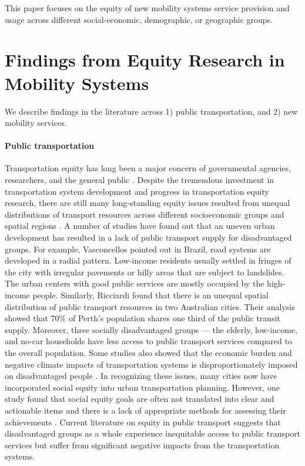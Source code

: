 \documentclass[11pt]{article}
\begin{document}
This paper focuses on the equity of new mobility systems service provision and usage across different social-economic, demographic, or geographic groups. 


\section{Findings from Equity Research in Mobility Systems}
\label{sec:others}
We describe findings in the literature across 1) public transportation, and 2) new mobility services.

\paragraph{Public transportation}

Transportation equity has long been a major concern of governmental agencies, researchers, and the general public \cite{litman2018evaluating, shaheen2017travel, palmateer2017justice}. Despite the tremendous investment in transportation system development and progress in transportation equity research, there are still many long-standing equity issues resulted from unequal distributions of transport resources across different socioeconomic groups and spatial regions \cite{raphael2002car, bullard2003addressing, ricciardi2015exploring, el2016cost}. A number of studies have found out that an uneven urban development has resulted in a lack of public transport supply for disadvantaged groups.  For example, Vasconcellos \cite{vasconcellos2018urban} pointed out in Brazil, road systems are developed in a radial pattern. Low-income residents usually settled in fringes of the city with irregular pavements or hilly areas that are subject to landslides. The urban centers with good public services are mostly occupied by the high-income people.  Similarly, Ricciardi \cite{ricciardi2015exploring} found that there is an unequal spatial distribution of public transport resources in two Australian cities. Their analysis showed that 70\% of Perth’s population shares one third of the public transit supply. Moreover, three socially disadvantaged groups --– the elderly, low-income, and no-car households have less access to public transport services compared to the overall population. Some studies also showed that the economic burden and negative climate impacts of transportation systems is disproportionately imposed on disadvantaged people \cite{bullard2003addressing, feng2014trade, cohen2017framework}. In recognizing these issues, many cities now have incorporated social equity into urban transportation planning. However, one study found that social equity goals are often not translated into clear and actionable items and there is a lack of appropriate methods for assessing their achievements \cite{manaugh2015integrating, litman2018evaluating}. Current literature on equity in public transport suggests that disadvantaged groups as a whole experience inequitable access to public transport services but suffer from significant negative impacts from the transportation systems. 
\end{document}
